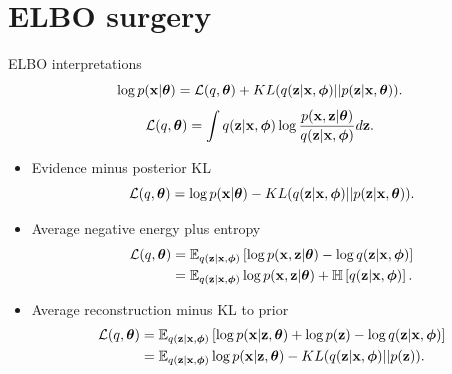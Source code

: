 \documentclass{beamer}
\begin{document}
\section{ELBO surgery}
\begin{frame}{ELBO interpretations}
	\[
		\log p(\mathbf{x} | \boldsymbol{\theta}) = \mathcal{L} (q, \boldsymbol{\theta}) + KL(q(\mathbf{z} | \mathbf{x}, \boldsymbol{\phi}) || p(\mathbf{z} | \mathbf{x}, \boldsymbol{\theta})).
	\]
	\[
		\mathcal{L} (q, \boldsymbol{\theta}) = \int q(\mathbf{z} | \mathbf{x}, \boldsymbol{\phi}) \log \frac{p(\mathbf{x}, \mathbf{z} | \boldsymbol{\theta})}{q(\mathbf{z} | \mathbf{x}, \boldsymbol{\phi})} d \mathbf{z}.
	\]
	\begin{itemize}
	    \item Evidence minus posterior KL
	    \vspace{-0.1cm}
	    \[
	        \mathcal{L}(q, \boldsymbol{\theta}) = \log p(\mathbf{x} | \boldsymbol{\theta}) - KL(q(\mathbf{z} | \mathbf{x}, \boldsymbol{\phi}) || p(\mathbf{z} | \mathbf{x}, \boldsymbol{\theta})).
	    \]
	    \item Average negative energy plus entropy
	    \vspace{-0.1cm}
	    \begin{align*}
	        \mathcal{L}(q, \boldsymbol{\theta}) &= \mathbb{E}_{q(\mathbf{z} | \mathbf{x}, \boldsymbol{\phi})} \left[\log p(\mathbf{x}, \mathbf{z} | \boldsymbol{\theta}) - \log q(\mathbf{z} | \mathbf{x}, \boldsymbol{\phi})  \right] \\
	        &= \mathbb{E}_{q(\mathbf{z} | \mathbf{x}, \boldsymbol{\phi})} \log p(\mathbf{x}, \mathbf{z} | \boldsymbol{\theta}) + \mathbb{H} \left[q(\mathbf{z} | \mathbf{x}, \boldsymbol{\phi}) \right].
	    \end{align*}
	    \item Average reconstruction minus KL to prior
	    \vspace{-0.1cm}
	    \begin{align*}
	        \mathcal{L}(q, \boldsymbol{\theta}) &= \mathbb{E}_{q(\mathbf{z} | \mathbf{x}, \boldsymbol{\phi})} \left[ \log p(\mathbf{x} | \mathbf{z}, \boldsymbol{\theta}) + \log p(\mathbf{z}) - \log q(\mathbf{z} | \mathbf{x}, \boldsymbol{\phi}) \right] \\
	        &= \mathbb{E}_{q(\mathbf{z} | \mathbf{x}, \boldsymbol{\phi})} \log p(\mathbf{x} | \mathbf{z}, \boldsymbol{\theta}) - KL(q(\mathbf{z} | \mathbf{x}, \boldsymbol{\phi}) || p(\mathbf{z})).
	    \end{align*}
	\end{itemize}
\end{frame}
\end{document}
